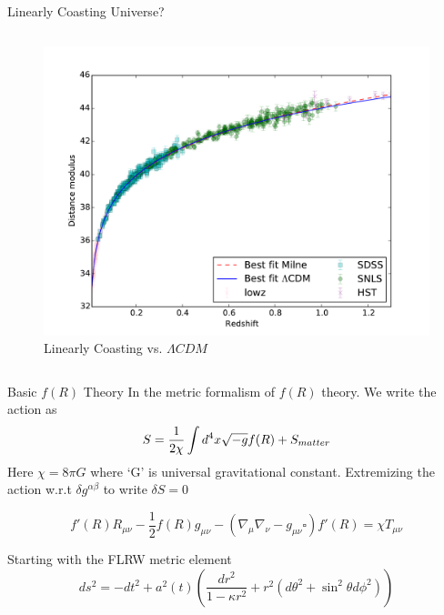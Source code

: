 \documentclass[final,hyperref={pdfpagelabels=false}]{beamer}
\begin{document}
\begin{frame}[t]
\begin{columns}[t]
\begin{column}{.465\textwidth}
\begin{block}{Linearly Coasting Universe?}
\begin{columns}
\begin{column}{.60\textwidth} %
\centering
\begin{figure}
\includegraphics[width=0.75\linewidth]{"./figures/Sarkar_fig3a"}
\caption{Linearly Coasting vs. $\Lambda CDM$\cite{nielsen2015marginal}}
\end{figure}
\end{column}
\end{columns} %

\end{block}


\begin{block}{Basic $f(R)$ Theory}
In the metric formalism of $f(R)$ theory. We write the action as 
\begin{equation}
S={1 \over 2\chi} \int d^4x\sqrt{-g}f(R)+S_{matter}
\end{equation}
Here $\chi=8\pi G$ where `G' is universal gravitational constant.
Extremizing the action w.r.t $\delta g^{\alpha\beta}$ to write $\delta S=0$

\begin{equation}
	f'(R)R_{\mu\nu}-
\frac{1}{2}f(R)g_{\mu\nu}
-(\nabla_\mu\nabla_\nu-g_{\mu\nu}\square)f'(R)=\chi T_{\mu\nu}
\label{gfe}
\end{equation}

Starting with the FLRW metric element 
\begin{equation}
ds^2=-dt^2+a^2(t)\left(\dfrac{dr^2}{1-\kappa r^2}+r^2(d\theta^2+\sin^2\theta d\phi^2)\right)
\end{equation}


\end{block}
\end{column}
\end{columns}
\end{frame}
\end{document}
